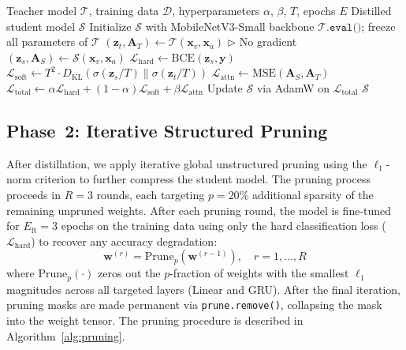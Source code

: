 \documentclass[lettersize,journal]{IEEEtran}
\begin{document}
\begin{algorithm}[!t]
\caption{PIN-Lite Knowledge Distillation}
\label{alg:distillation}
\begin{algorithmic}[1]
\REQUIRE Teacher model $\mathcal{T}$, training data $\mathcal{D}$, hyperparameters $\alpha$, $\beta$, $T$, epochs $E$
\ENSURE Distilled student model $\mathcal{S}$
\STATE Initialize $\mathcal{S}$ with MobileNetV3-Small backbone
\STATE $\mathcal{T}.\texttt{eval()}$; freeze all parameters of $\mathcal{T}$
        \STATE $(\mathbf{z}_t, \mathbf{A}_T) \leftarrow \mathcal{T}(\mathbf{x}_v, \mathbf{x}_a)$ \hfill $\triangleright$ No gradient
        \STATE $(\mathbf{z}_s, \mathbf{A}_S) \leftarrow \mathcal{S}(\mathbf{x}_v, \mathbf{x}_a)$
        \STATE $\mathcal{L}_{\text{hard}} \leftarrow \text{BCE}(\mathbf{z}_s, \mathbf{y})$
        \STATE $\mathcal{L}_{\text{soft}} \leftarrow T^2 \cdot D_{\text{KL}}\!\left(\sigma(\mathbf{z}_s / T) \| \sigma(\mathbf{z}_t / T)\right)$
        \STATE $\mathcal{L}_{\text{attn}} \leftarrow \text{MSE}(\mathbf{A}_S, \mathbf{A}_T)$
        \STATE $\mathcal{L}_{\text{total}} \leftarrow \alpha \mathcal{L}_{\text{hard}} + (1{-}\alpha)\mathcal{L}_{\text{soft}} + \beta \mathcal{L}_{\text{attn}}$
        \STATE Update $\mathcal{S}$ via AdamW on $\mathcal{L}_{\text{total}}$
    \ENDFOR
\ENDFOR
\RETURN $\mathcal{S}$
\end{algorithmic}
\end{algorithm}


\subsection{Phase~2: Iterative Structured Pruning}
\label{sec:pruning}

After distillation, we apply iterative global unstructured pruning using the $\ell_1$-norm criterion to further compress the student model. The pruning process proceeds in $R = 3$ rounds, each targeting $p = 20\%$ additional sparsity of the remaining unpruned weights. After each pruning round, the model is fine-tuned for $E_{\text{ft}} = 3$ epochs on the training data using only the hard classification loss ($\mathcal{L}_{\text{hard}}$) to recover any accuracy degradation:
\begin{equation}
    \mathbf{w}^{(r)} = \text{Prune}_{p}\!\left(\mathbf{w}^{(r-1)}\right), \quad r = 1, \ldots, R
\end{equation}
where $\text{Prune}_p(\cdot)$ zeros out the $p$-fraction of weights with the smallest $\ell_1$ magnitudes across all targeted layers (Linear and GRU). After the final iteration, pruning masks are made permanent via \texttt{prune.remove()}, collapsing the mask into the weight tensor. The pruning procedure is described in Algorithm~\ref{alg:pruning}.
\end{document}
